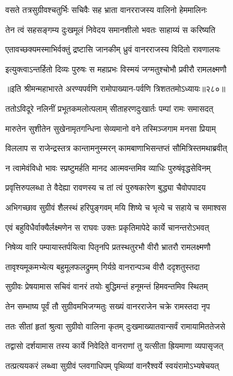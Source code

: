 \twolineshloka
{वसते तत्रसुग्रीवश्चतुर्भिः सचिवैः सह}
{भ्राता वानरराजस्य वालिनो हेममालिनः}


\twolineshloka
{तेन त्वं सहसङ्गम्य दुःखमूलं निवेदय}
{समानशीलो भवतः साहाय्यं स करिष्यति}


\twolineshloka
{एतावच्छक्यमस्माभिर्वक्तुं द्रष्टासि जानकीम्}
{ध्रुवं वानरराजस्य विदितो रावणालयः}


\twolineshloka
{इत्युक्त्वाऽन्तर्हितो दिव्यः पुरुषः स महाप्रभः}
{विस्मयं जग्मतुश्चोभौ प्रवीरौ रामलक्ष्मणौ}


॥इति श्रीमन्महाभारते अरण्यपर्वणि रामोपाख्यान-पर्वणि त्रिशततमोऽध्यायः॥२८०॥




\twolineshloka
{ततोऽविदूरे नलिनीं प्रभूतकमलोत्पलाम्}
{सीताहरणदुःखार्तः पम्पां रामः समासदत्}


\twolineshloka
{मारुतेन सुशीतेन सुखेनामृतगन्धिना}
{सेव्यमानो वने तस्मिञ्जगाम मनसा प्रियाम्}


\twolineshloka
{विललाप स राजेन्द्रस्तत्र कान्तामनुस्मरन्}
{कामबाणाभिसन्तप्तं सौमित्रिस्तमथाब्रवीत्}


\twolineshloka
{न त्वामेवंविधो भावः स्प्रष्टुमर्हति मानद}
{आत्मवन्तमिव व्याधिः पुरुषंवृद्धसेविनम्}


\twolineshloka
{प्रवृत्तिरुपलब्धा ते वैदेह्या रावणस्य च}
{तां त्वं पुरुषकारेण बुद्ध्या चैवोपपादय}


\twolineshloka
{अभिगच्छाव सुग्रीवं शैलस्थं हरिपुङ्गवम्}
{मयि शिष्ये च भृत्ये च सहाये च समाश्वस}


\twolineshloka
{एवं बहुविधैर्वाक्यैर्लक्ष्मणेन स राघवः}
{उक्तः प्रकृतिमापेदे कार्ये चानन्तरोऽभवत्}


\twolineshloka
{निषेव्य वारि पम्पायास्तर्पयित्वा पितृनपि}
{प्रतस्थतुरभौ वीरौ भ्रातरौ रामलक्ष्मणौ}


\twolineshloka
{तावृश्यमूकमभ्येत्य बहुमूलफलद्रुमम्}
{गिर्यग्रे वानरान्पञ्च वीरौ ददृशतुस्तदा}


\twolineshloka
{सुग्रीवः प्रेषयामास सचिवं वानरं तयोः}
{बुद्धिमन्तं हनूमन्तं हिमवन्तमिव स्थितम्}


\twolineshloka
{तेन सम्भाष्य पूर्वं तौ सुग्रीवमभिजग्मतुः}
{सख्यं वानरराजेन चक्रे रामस्तदा नृप}


\twolineshloka
{ततः सीतां हृतां श्रुत्वा सुग्रीवो वालिना कृतम्}
{दुःखमाख्यातवान्सर्वं रामायामिततेजसे}


\twolineshloka
{तद्वासो दर्शयामास तस्य कार्ये निवेदिते}
{वानराणां तु यत्सीता ह्रियमाणा व्यपासृजत्}


\twolineshloka
{तत्प्रत्ययकरं लब्ध्वा सुग्रीवं प्लवगाधिपम्}
{पृथिव्यां वानरैश्वर्ये स्वयंरामोऽभ्यषेचयत्}


